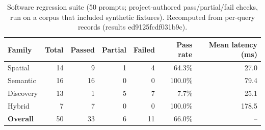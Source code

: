 \begin{table}[htbp]\centering\small
\caption{Software regression suite (50 prompts; project-authored pass/partial/fail checks, run on a corpus that included synthetic fixtures). Recomputed from per-query records (results ed9125fcdf031b9c).}\label{tab:benchmark}
\begin{tabular}{lrrrrrr}
\toprule
Family & Total & Passed & Partial & Failed & Pass rate & Mean latency (ms) \\
\midrule
Spatial & 14 & 9 & 1 & 4 & 64.3\% & 27.0 \\
Semantic & 16 & 16 & 0 & 0 & 100.0\% & 79.4 \\
Discovery & 13 & 1 & 5 & 7 & 7.7\% & 25.1 \\
Hybrid & 7 & 7 & 0 & 0 & 100.0\% & 178.5 \\
\textbf{Overall} & 50 & 33 & 6 & 11 & 66.0\% & -- \\
\bottomrule
\end{tabular}
\end{table}

